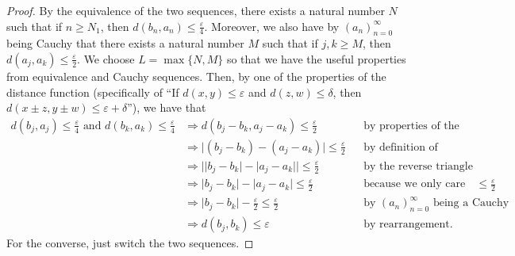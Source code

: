 \begin{proof}
    By the equivalence of the two sequences, there exists a natural number $N$ such that if $n \geq N_1$, then $d(b_n, a_n) \leq \frac{\varepsilon}{4}$.
    Moreover, we also have by $(a_n)_{n=0}^\infty$ being Cauchy that there exists a natural number $M$ such that if $j, k \geq M$, then $d(a_j, a_k) \leq \frac{\varepsilon}{2}$.
    We choose $L = \max \{N, M \}$ so that we have the useful properties from equivalence and Cauchy sequences.
    Then, by one of the properties of the distance function (specifically of ``If $d(x, y) \leq \varepsilon$ and $d(z, w) \leq \delta$, then $d(x \pm z, y \pm w) \leq \varepsilon + \delta$''), we have that
    \begin{align*}
        d(b_j, a_j) \leq \frac{\varepsilon}{4} \text{ and } d(b_k, a_k) \leq \frac{\varepsilon}{4} &\Longrightarrow d(b_j - b_k, a_j - a_k) \leq \frac{\varepsilon}{2} &&\text{by properties of the distance function} \\
        &\Longrightarrow \lvert (b_j - b_k) - (a_j - a_k) \rvert \leq \frac{\varepsilon}{2} &&\text{by definition of distance}\\
        &\Longrightarrow \big\lvert \lvert b_j - b_k \rvert - \lvert a_j - a_k \rvert \big\rvert \leq \frac{\varepsilon}{2} &&\text{by the reverse triangle inequality}\\
        &\Longrightarrow \lvert b_j - b_k \rvert - \lvert a_j - a_k \rvert  \leq \frac{\varepsilon}{2} && \text{because we only care about being $\leq \frac{\varepsilon}{2}$}\\
        &\Longrightarrow \lvert b_j - b_k \rvert - \frac{\varepsilon}{2}  \leq \frac{\varepsilon}{2}  &&\text{by $(a_n)_{n=0}^\infty$ being a Cauchy sequence}\\
        &\Longrightarrow d(b_j, b_k) \leq \varepsilon &&\text{by rearrangement.}
    \end{align*}
    For the converse, just switch the two sequences.
\end{proof} 

